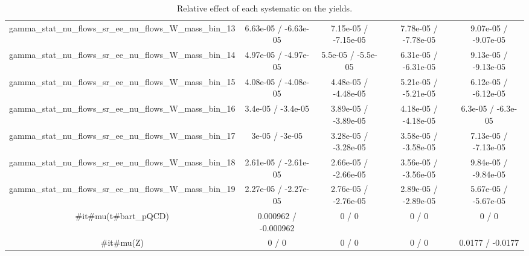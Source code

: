 \documentclass[10pt]{article}
\begin{document}
\begin{table}[htbp]
\begin{center}
\begin{tabular}{|c|c|c|c|c|}
  gamma_stat_nu_flows_sr_ee_nu_flows_W_mass_bin_13 & 6.63e-05 / -6.63e-05 & 7.15e-05 / -7.15e-05 & 7.78e-05 / -7.78e-05 & 9.07e-05 / -9.07e-05 \\ 
  gamma_stat_nu_flows_sr_ee_nu_flows_W_mass_bin_14 & 4.97e-05 / -4.97e-05 & 5.5e-05 / -5.5e-05 & 6.31e-05 / -6.31e-05 & 9.13e-05 / -9.13e-05 \\ 
  gamma_stat_nu_flows_sr_ee_nu_flows_W_mass_bin_15 & 4.08e-05 / -4.08e-05 & 4.48e-05 / -4.48e-05 & 5.21e-05 / -5.21e-05 & 6.12e-05 / -6.12e-05 \\ 
  gamma_stat_nu_flows_sr_ee_nu_flows_W_mass_bin_16 & 3.4e-05 / -3.4e-05 & 3.89e-05 / -3.89e-05 & 4.18e-05 / -4.18e-05 & 6.3e-05 / -6.3e-05 \\ 
  gamma_stat_nu_flows_sr_ee_nu_flows_W_mass_bin_17 & 3e-05 / -3e-05 & 3.28e-05 / -3.28e-05 & 3.58e-05 / -3.58e-05 & 7.13e-05 / -7.13e-05 \\ 
  gamma_stat_nu_flows_sr_ee_nu_flows_W_mass_bin_18 & 2.61e-05 / -2.61e-05 & 2.66e-05 / -2.66e-05 & 3.56e-05 / -3.56e-05 & 9.84e-05 / -9.84e-05 \\ 
  gamma_stat_nu_flows_sr_ee_nu_flows_W_mass_bin_19 & 2.27e-05 / -2.27e-05 & 2.76e-05 / -2.76e-05 & 2.89e-05 / -2.89e-05 & 5.67e-05 / -5.67e-05 \\ 
  #it{#mu}(t#bar{t}_{pQCD}) & 0.000962 / -0.000962 & 0 / 0 & 0 / 0 & 0 / 0 \\ 
  #it{#mu}(Z) & 0 / 0 & 0 / 0 & 0 / 0 & 0.0177 / -0.0177 \\ 
\hline 
\end{tabular} 
\caption{Relative effect of each systematic on the yields.} 
\end{center} 
\end{table} 
\end{document}
